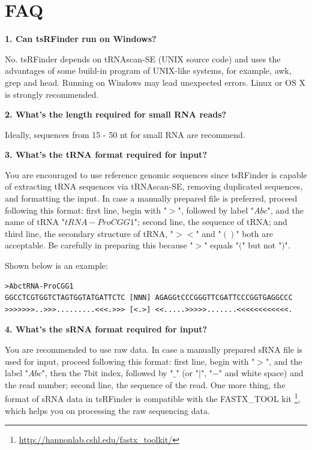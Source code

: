 \documentclass[11pt, a4paper]{article}
\begin{document}
\section{FAQ}

\textbf{1. Can tsRFinder run on Windows?}

No. tsRFinder depends on tRNAscan-SE (UNIX source code) and uses the advantages of some build-in program of UNIX-like systems, for example, awk, grep and head. Running on Windows may lead unexpected errors. Linux or OS X is strongly recommended.

\textbf{2. What's the length required for small RNA reads?}

Ideally, sequences from 15 - 50 nt for small RNA are recommend.

\textbf{3. What's the tRNA format required for input?}

You are encouraged to use reference genomic sequences since tsRFinder is capable of extracting tRNA sequences via tRNAscan-SE, removing duplicated sequences, and formatting the input. In case a manually prepared file is preferred, proceed following this format: first line, begin with "$>$", followed by label "$Abc$", and the name of tRNA "$tRNA-ProCGG1$"; second line, the sequence of tRNA; and third line, the secondary structure of tRNA, "$><$" and "$()$" both are acceptable. Be carefully in preparing this because "$>$" equals "$($" but not "$)$".

Shown below is an example:

{\scriptsize \begin{tcolorbox}[colback=blue!5!white,colframe=pink!75!black,title=tRNA example]
\begin{verbatim}
>AbctRNA-ProCGG1
GGCCTCGTGGTCTAGTGGTATGATTCTC [NNN] AGAGGtCCCGGGTTCGATTCCCGGTGAGGCCC
>>>>>>>..>>>.........<<<.>>> [<.>] <<.....>>>>>.......<<<<<<<<<<<<.
\end{verbatim}
\end{tcolorbox}}

\textbf{4. What's the sRNA format required for input?}

You are recommended to use raw data. In case a manually prepared sRNA file is used for input, proceed following this format: first line, begin with "$>$", and the label "$Abc$", then the 7\-bit index, followed by "$\_$" (or "$|$", "$-$" and white space) and the read number; second line, the sequence of the read. One more thing, the format of sRNA data in tsRFinder is compatible with the FASTX\_TOOL kit \footnote{\url{http://hannonlab.cshl.edu/fastx_toolkit/}}, which helps you on processing the raw sequencing data.
\end{document}
